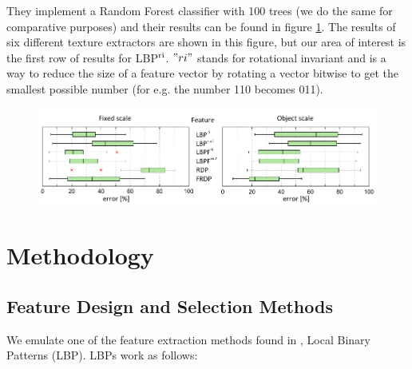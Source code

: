 \begin{multicols}{2}
They implement a Random Forest classifier with 100 trees (we do the same for comparative purposes) and their results can be found in figure \ref{fig:relwork_results}. The results of six different texture extractors are shown in this figure, but our area of interest is the first row of results for LBP$^\textnormal{ri}$. $"ri"$ stands for rotational invariant and is a way to reduce the size of a feature vector by rotating a vector bitwise to get the smallest possible number (for e.g. the number 110 becomes 011). 
\begin{figure}
	\centering
	\includegraphics[width=\linewidth]{images/boxes_results.png}
	\label{fig:relwork_results}
\end{figure} 


\section{Methodology}

\subsection{Feature Design and Selection Methods}
We emulate one of the feature extraction methods found in \citet{kylberg2011virus}, Local Binary Patterns (LBP). LBPs work as follows:


\end{multicols}
